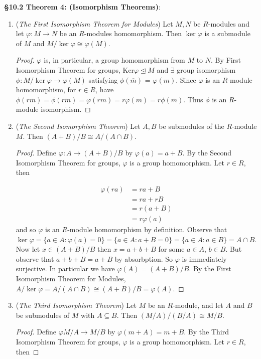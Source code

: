 \documentclass[8pt]{amsart}
\theoremstyle{plain}%
\theoremstyle{definition}
\theoremstyle{remark}
\numberwithin{equation}{section}
\begin{document}
\textbf{\S10.2 Theorem 4: (Isomorphism Theorems)}:
	\begin{enumerate}
		\item (\textit{The First Isomorphism Theorem for Modules}) Let $M, N$ be $R$-modules and let $\varphi : M \to N$ be an $R$-modules homomorphism. Then $\ker \varphi$ is a submodule of $M$ and $M/\ker \varphi \cong \varphi(M)$.
			\begin{proof}
				$\varphi$ is, in particular, a group homomorphism from $M$ to $N$. By First Isomorphism Theorem for groups, Ker$\varphi \trianglelefteq M$ and $\exists$ group isomorphism $\phi : M/\ker \varphi \to \varphi(M)$ satisfying $\phi(\overline{m})$ = $\varphi(m)$. Since $\varphi$ is an $R$-module homomorphism, for $r \in R$, have $\phi(r\overline{m}) = \phi(\overline{rm}) = \varphi(rm) = r\varphi(m) = r\phi(\overline{m})$. Thus $\phi$ is an $R$-module isomorphism.  
			\end{proof}
		\item (\textit{The Second Isomorphism Theorem}) Let $A, B$ be submodules of the $R$-module $M$. Then $(A + B)/B \cong A/(A \cap B)$.
			\begin{proof}
				Define $\varphi : A \to (A + B)/B$ by $\varphi(a) = a + B$. By the Second Isomorphism Theorem for groups, $\varphi$ is a group homomorphism. Let $r \in R$, then
				
				\begin{align*}
						\varphi(ra) &= ra + B\\
						&= ra + rB\\
						&= r(a + B)\\
						&= r\varphi(a)
					\end{align*}
					and so $\varphi$ is an $R$-module homomorphism by definition. Observe that $\ker \varphi = \{a \in A : \varphi(a) = 0\} = \{a \in A : a + B = 0\} = \{a \in A : a \in B\} = A \cap B$. Now let $x \in (A + B)/B$ then $x = a + b + B$ for some $a \in A$, $b \in B$. But observe that $a + b + B = a + B$ by absorbption. So $\varphi$ is immediately surjective. In particular we have $\varphi(A) = (A + B)/B$. By the First Isomorphism Theorem for Modules, $A/\ker \varphi = A/(A \cap B) \cong (A + B)/B = \varphi(A)$.
			\end{proof}
		\item (\textit{The Third Isomorphism Theorem}) Let $M$ be an $R$-module, and let $A$ and $B$ be submodules of $M$ with $A \subseteq B$. Then $(M/A)/(B/A) \cong M/B$.
			\begin{proof}
				Define $\varphi M/A \to M/B$ by $\varphi(m + A) = m + B$. By the Third Isomorphism Theorem for groups, $\varphi$ is a group homomorphism. Let $r \in R$, then
				

\end{proof}
\end{enumerate}
\end{document}

